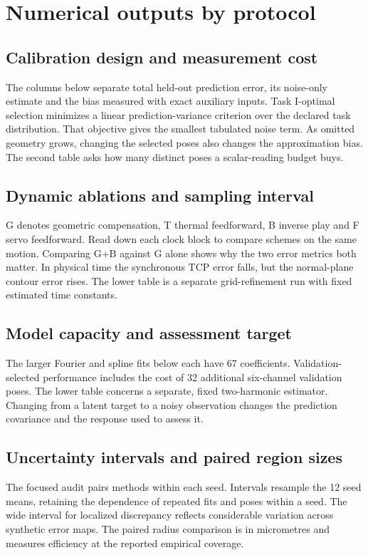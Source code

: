 \clearpage\section{Numerical outputs by protocol}
\subsection{Calibration design and measurement cost}
The columns below separate total held-out prediction error, its noise-only estimate and the bias measured with exact auxiliary inputs. Task I-optimal selection minimizes a linear prediction-variance criterion over the declared task distribution. That objective gives the smallest tabulated noise term. As omitted geometry grows, changing the selected poses also changes the approximation bias. The second table asks how many distinct poses a scalar-reading budget buys.

\clearpage\subsection{Dynamic ablations and sampling interval}
G denotes geometric compensation, T thermal feedforward, B inverse play and F servo feedforward. Read down each clock block to compare schemes on the same motion. Comparing G+B against G alone shows why the two error metrics both matter. In physical time the synchronous TCP error falls, but the normal-plane contour error rises. The lower table is a separate grid-refinement run with fixed estimated time constants.

\clearpage\subsection{Model capacity and assessment target}
The larger Fourier and spline fits below each have 67 coefficients. Validation-selected performance includes the cost of 32 additional six-channel validation poses. The lower table concerns a separate, fixed two-harmonic estimator. Changing from a latent target to a noisy observation changes the prediction covariance and the response used to assess it.

\clearpage\subsection{Uncertainty intervals and paired region sizes}
The focused audit pairs methods within each seed. Intervals resample the 12 seed means, retaining the dependence of repeated fits and poses within a seed. The wide interval for localized discrepancy reflects considerable variation across synthetic error maps. The paired radius comparison is in micrometres and measures efficiency at the reported empirical coverage.



